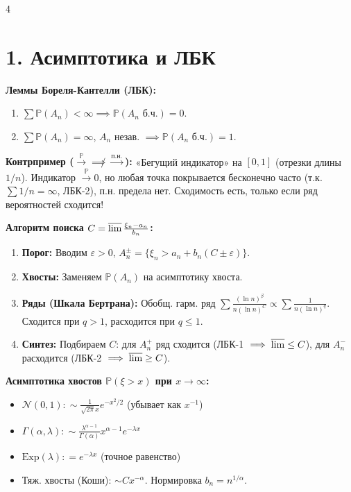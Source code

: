 \documentclass[8pt, a4paper, landscape]{extarticle}
\renewcommand{\P}{\mathbb{P}}
\newcommand{\N}{\mathcal{N}}
\begin{document}
\begin{multicols*}{4}

\section*{1. Асимптотика и ЛБК}
\textbf{Леммы Бореля-Кантелли (ЛБК):}
\begin{enumerate}
    \item $\sum \P(A_n) < \infty \implies \P(A_n \text{ б.ч.}) = 0$.
    \item $\sum \P(A_n) = \infty$, $A_n$ незав. $\implies \P(A_n \text{ б.ч.}) = 1$.
\end{enumerate}

\textbf{Контрпример ($\xrightarrow{\P} \not\implies \xrightarrow{п.н.}$):} «Бегущий индикатор» на $[0,1]$ (отрезки длины $1/n$). Индикатор $\xrightarrow{\P} 0$, но любая точка покрывается бесконечно часто (т.к. $\sum 1/n = \infty$, ЛБК-2), п.н. предела нет. Сходимость есть, только если ряд вероятностей сходится!

\textbf{Алгоритм поиска $C = \varlimsup \frac{\xi_n - a_n}{b_n}$:}
\begin{enumerate}
    \item \textbf{Порог:} Вводим $\varepsilon>0$, $A_n^\pm = \{ \xi_n > a_n + b_n(C \pm \varepsilon) \}$.
    \item \textbf{Хвосты:} Заменяем $\P(A_n)$ на асимптотику хвоста.
    \item \textbf{Ряды (Шкала Бертрана):} Обобщ. гарм. ряд $\sum \frac{(\ln n)^\beta}{n(\ln n)^C} \propto \sum \frac{1}{n(\ln n)^q}$. Сходится при $q>1$, расходится при $q \le 1$.
    \item \textbf{Синтез:} Подбираем $C$: для $A_n^+$ ряд сходится (ЛБК-1 $\implies \varlimsup \le C$), для $A_n^-$ расходится (ЛБК-2 $\implies \varlimsup \ge C$).
\end{enumerate}

\textbf{Асимптотика хвостов $\P(\xi > x)$ при $x \to \infty$:}
\begin{itemize}
    \item $\N(0,1): \sim \frac{1}{\sqrt{2\pi} x} e^{-x^2/2}$ (убывает как $x^{-1}$)
    \item $\Gamma(\alpha, \lambda): \sim \frac{\lambda^{\alpha-1}}{\Gamma(\alpha)} x^{\alpha-1} e^{-\lambda x}$
    \item $\text{Exp}(\lambda): = e^{-\lambda x}$ (точное равенство)
    \item Тяж. хвосты (Коши): $\sim C x^{-\alpha}$. Нормировка $b_n=n^{1/\alpha}$.
\end{itemize}


\end{multicols*}
\end{document}
